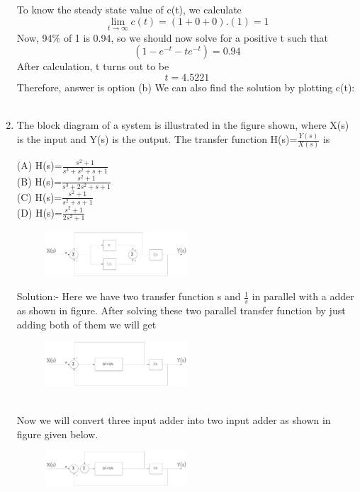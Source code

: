 \documentclass[journal,12pt,twocolumn]{IEEEtran}
\renewcommand\thesection{\arabic{section}}
\begin{document}
\begin{enumerate}[label=\arabic*.,ref=\thesection.\theenumi]
To know the steady state value of c(t), we calculate 
$$\lim_{t\to\infty} c(t) = (1+0+0).(1) = 1$$
Now, 94\% of 1 is 0.94, so we should now solve for a positive t such that
$$(1 - e^{-t} - te^{-t}) = 0.94$$
After calculation, t turns out to be
$$ t = 4.5221$$
Therefore, answer is option (b)
We can also find the solution by plotting c(t):
\\\

\item
The block diagram of a system is illustrated in the figure shown, where X(s) is the input and Y(s) is the output. The transfer function H(s)=$\frac{Y(s)}{X(s)}$ is 

(A) H(s)=$\frac{s^2+1}{s^3+s^2+s+1}$ \\
(B) H(s)=$\frac{s^2+1}{s^3+2s^2+s+1}$ \\
(C) H(s)=$\frac{s^2+1}{s^2+s+1}$ \\
(D) H(s)=$\frac{s^2+1}{2s^2+1}$
\\
\begin{figure}[h]
\includegraphics[width=0.5\textwidth]{./figs/pic1.eps}
\end{figure}
%
{Solution:- }
Here we have two transfer function s and $\frac{1}{s}$ in parallel with a adder as shown in figure.
After solving these two parallel transfer function by just adding both of them we will get
\begin{figure}[h]
\includegraphics[width=0.5\textwidth]{./figs/pic2.eps}
\end{figure}
\\
Now we will convert three input adder into two input adder as shown in figure given below.
\begin{figure}[h]
\includegraphics[width=0.5\textwidth]{./figs/pic3.eps}
\end{figure}
\\

\end{enumerate}
\end{document}
